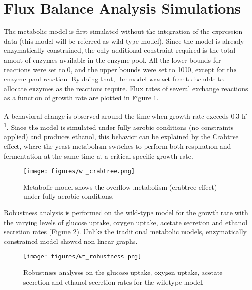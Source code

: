 \section{Flux Balance Analysis Simulations}

The metabolic model is first simulated without the integration of the expression data (this model will be referred as wild-type model). Since the model is already enzymatically constrained, the only additional constraint required is the total amout of enzymes available in the enzyme pool. All the lower bounds for reactions were set to 0, and the upper bounds were set to 1000, except for the enzyme pool reaction. By doing that, the model was set free to be able to allocate enzymes as the reactions require. Flux rates of several exchange reactions as a function of growth rate are plotted in Figure \ref{fig:wt_crabtree}.

A behavioral change is observed around the time when growth rate exceeds 0.3 h\textsuperscript{-1}. Since the model is simulated under fully aerobic conditions (no constraints applied) and produces ethanol, this behavior can be explained by the Crabtree effect, where the yeast metabolism switches to perform both respiration and fermentation at the same time at a critical specific growth rate.

\begin{figure}[H]
  \begin{center}
  \texttt{[image: figures/wt\_crabtree.png]}
  \caption[Metabolic model shows the overflow metabolism]{Metabolic model shows the overflow metabolism (crabtree effect) under fully aerobic conditions.}
  \label{fig:wt_crabtree}
  \end{center}
\end{figure}

Robustness analysis is performed on the wild-type model for the growth rate with the varying levels of glucose uptake, oxygen uptake, acetate secretion and ethanol secretion rates (Figure \ref{fig:wt_robustness}). Unlike the traditional metabolic models, enzymatically constrained model showed non-linear graphs.

\begin{figure}[H]
  \begin{center}
  \texttt{[image: figures/wt\_robustness.png]}
  \caption[Robustness analyses on the glucose uptake, oxygen uptake, acetate secretion and ethanol secretion rates for the wildtype model]{Robustness analyses on the glucose uptake, oxygen uptake, acetate secretion and ethanol secretion rates for the wildtype model.}
  \label{fig:wt_robustness}
  \end{center}
\end{figure}

